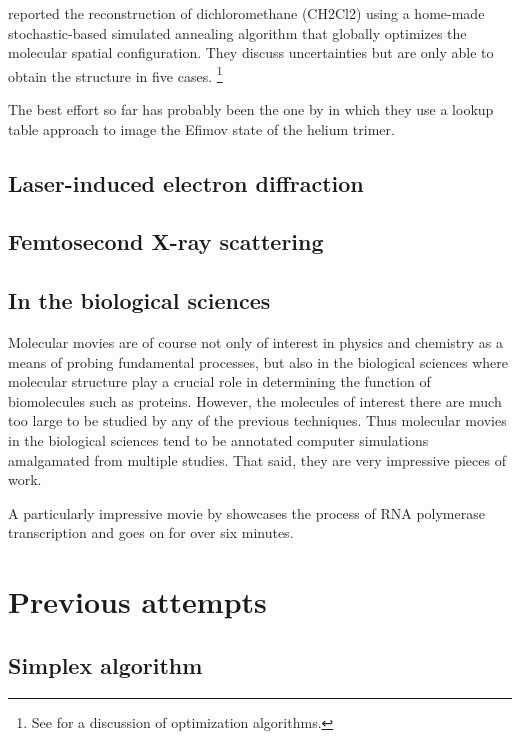 \citet{Gagnon08} reported the reconstruction of dichloromethane (CH2Cl2) using a home-made  stochastic-based simulated annealing algorithm that globally optimizes the molecular spatial configuration. They discuss uncertainties but are only able to obtain the structure in five cases. \footnote{See \citet{Bocharova11} for a discussion of optimization algorithms.}

The best effort so far has probably been the one by \citet{Kunitski15} in which they use a lookup table approach to image the Efimov state of the helium trimer.

\subsection{Laser-induced electron diffraction}
\subsection{Femtosecond X-ray scattering}

\subsection{In the biological sciences}
Molecular movies are of course not only of interest in physics and chemistry as a means of probing fundamental processes, but also in the biological sciences where molecular structure play a crucial role in determining the function of biomolecules such as proteins. However, the molecules of interest there are much too large to be studied by any of the previous techniques. Thus molecular movies in the biological sciences tend to be annotated computer simulations amalgamated from multiple studies. That said, they are very impressive pieces of work.

A particularly impressive movie by \citet{Cheung12} showcases the process of RNA polymerase transcription and goes on for over six minutes.

\section{Previous attempts}

\subsection{Simplex algorithm}


